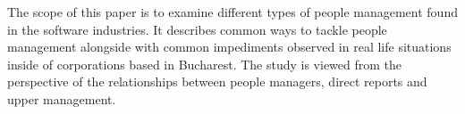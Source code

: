 

\newline
The scope of this paper is to examine different types of people management found in the software industries. It describes common ways to tackle people management alongside with common impediments observed in real life situations inside of corporations based in Bucharest. The study is viewed from the perspective of the relationships between people managers, direct reports and upper management.
